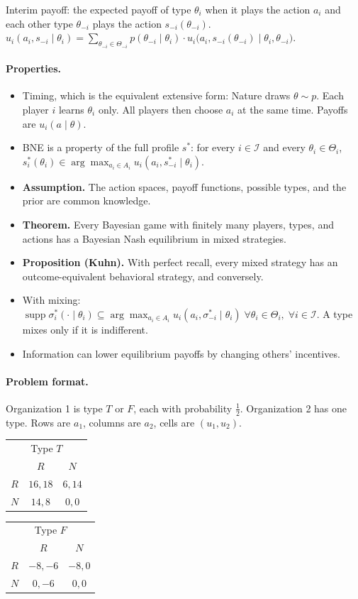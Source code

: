 \documentclass{article}
\newcommand{\res}[1]{\textbf{#1.}}
\begin{document}
Interim payoff: the expected payoff of type $\theta_i$ when it plays the action $a_i$ and each other type $\theta_{-i}$ plays the action $s_{-i}(\theta_{-i})$.
$u_i(a_i,s_{-i}\mid\theta_i)=\sum_{\theta_{-i}\in\Theta_{-i}}p(\theta_{-i}\mid\theta_i)\cdot u_i\big(a_i,s_{-i}(\theta_{-i})\mid\theta_i,\theta_{-i}\big)$.

\paragraph{Properties.}
\begin{itemize}
    \item Timing, which is the equivalent extensive form: Nature draws $\theta\sim p$. Each player $i$ learns $\theta_i$ only. All players then choose $a_i$ at the same time. Payoffs are $u_i(a\mid\theta)$.
    \item BNE is a property of the full profile $s^*$: for every $i\in\mathcal I$ and every $\theta_i\in\Theta_i$, $s_i^*(\theta_i)\in\arg\max_{a_i\in A_i}u_i(a_i,s_{-i}^*\mid\theta_i)$.
    \item \res{Assumption} The action spaces, payoff functions, possible types, and the prior are common knowledge.
    \item \res{Theorem} Every Bayesian game with finitely many players, types, and actions has a Bayesian Nash equilibrium in mixed strategies.
    \item \res{Proposition (Kuhn)} With perfect recall, every mixed strategy has an outcome-equivalent behavioral strategy, and conversely.
    \item With mixing: $\operatorname{supp}\sigma_i^*(\cdot\mid\theta_i) \subseteq \arg\max_{a_i\in A_i}u_i(a_i,\sigma_{-i}^*\mid\theta_i)\;\forall\theta_i\in\Theta_i,\;\forall i\in\mathcal I$. A type mixes only if it is indifferent.
    \item Information can lower equilibrium payoffs by changing others' incentives.
\end{itemize}

\paragraph{Problem format.}
Organization 1 is type $T$ or $F$, each with probability $\tfrac12$. Organization 2 has one type. Rows are $a_1$, columns are $a_2$, cells are $(u_1,u_2)$.
\begin{center}
\begin{tabular}{c|cc}
\multicolumn{3}{c}{Type $T$}\\
 & $R$ & $N$ \\
\hline
$R$ & $16,18$ & $6,14$ \\
$N$ & $14,8$ & $0,0$ \\
\end{tabular}
\qquad\qquad
\begin{tabular}{c|cc}
\multicolumn{3}{c}{Type $F$}\\
 & $R$ & $N$ \\
\hline
$R$ & $-8,-6$ & $-8,0$ \\
$N$ & $0,-6$ & $0,0$ \\
\end{tabular}
\end{center}
\end{document}
